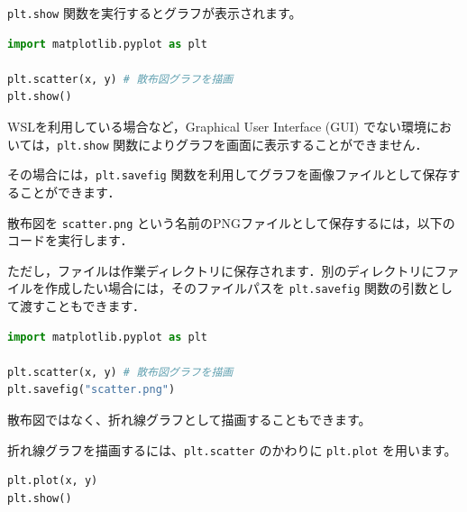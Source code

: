 \texttt{plt.show} 関数を実行するとグラフが表示されます。


\begin{lstlisting}[style=codecell,language=Python]
import matplotlib.pyplot as plt

plt.scatter(x, y) # 散布図グラフを描画
plt.show()
\end{lstlisting}


WSLを利用している場合など，Graphical User Interface (GUI) でない環境においては，\texttt{plt.show} 関数によりグラフを画面に表示することができません．

その場合には，\texttt{plt.savefig} 関数を利用してグラフを画像ファイルとして保存することができます．

散布図を \texttt{scatter.png} という名前のPNGファイルとして保存するには，以下のコードを実行します．

ただし，ファイルは作業ディレクトリに保存されます．別のディレクトリにファイルを作成したい場合には，そのファイルパスを \texttt{plt.savefig} 関数の引数として渡すこともできます．


\begin{lstlisting}[style=codecell,language=Python]
import matplotlib.pyplot as plt

plt.scatter(x, y) # 散布図グラフを描画
plt.savefig("scatter.png")
\end{lstlisting}


散布図ではなく、折れ線グラフとして描画することもできます。

折れ線グラフを描画するには、\texttt{plt.scatter} のかわりに \texttt{plt.plot} を用います。


\begin{lstlisting}[style=codecell,language=Python]
plt.plot(x, y)
plt.show()
\end{lstlisting}


